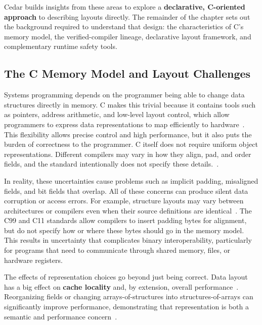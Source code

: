 Cedar builds insights from these areas to explore a \textbf{declarative,
C-oriented approach} to describing layouts directly. The remainder of the chapter
sets out the background required to understand that design: the characteristics
of C's memory model, the verified-compiler lineage, declarative layout
framework, and complementary runtime safety tools.


\subsection{The C Memory Model and Layout Challenges}
Systems programming depends on the programmer being able to change data structures
directly in memory. C makes this trivial because it contains tools such as
pointers, address arithmetic, and low-level layout control, which allow
programmers to express data representations to map efficiently
to hardware~\autocite{ritchie1993development, memory_bottleneck}. 
This flexibility allows precise control and high performance, but it also puts
the burden of correctness to the programmer.
C itself does not require
uniform object representations. Different compilers may vary in how they align, pad,
and order fields, and the standard intentionally does not
specify these details.~\autocite{whatyouc,strict_aliasing}.

In reality, these uncertainties cause problems such as
implicit padding, misaligned fields, and bit fields that overlap. All of
these concerns can produce silent data corruption or access errors. For example,
structure layouts may vary between architectures or compilers even when
their source definitions are 
identical~\autocite{packetc_bitfields,compiler_vulns}. The C99 and C11
standards allow compilers to insert padding bytes for alignment, but do not
specify how or where these bytes should go in the memory model.
This results in uncertainty that complicates binary interoperability, particularly for programs that
need to communicate through shared memory, files, or hardware registers.

The effects of representation choices go beyond just being correct. Data
layout has a big effect on \textbf{cache locality} and, by extension,
overall performance~\autocite{adt_layout_faria,kandemir1998enhancing,majeti2013compiler}.
Reorganizing fields or changing
arrays-of-structures into structures-of-arrays can significantly improve performance,
demonstrating that representation is both a semantic
and performance
concern~\autocite{perry2010automatic}.

